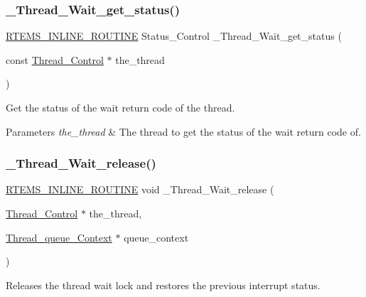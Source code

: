 \subsubsection{\texorpdfstring{\_Thread\_Wait\_get\_status()}{\_Thread\_Wait\_get\_status()}}
{\footnotesize\ttfamily \mbox{\hyperlink{group__RTEMSScoreBaseDefs_gac216239df231d5dbd15e3520b0b9313f}{R\+T\+E\+M\+S\+\_\+\+I\+N\+L\+I\+N\+E\+\_\+\+R\+O\+U\+T\+I\+NE}} Status\+\_\+\+Control \+\_\+\+Thread\+\_\+\+Wait\+\_\+get\+\_\+status (\begin{DoxyParamCaption}\item[{const \mbox{\hyperlink{struct__Thread__Control}{Thread\+\_\+\+Control}} $\ast$}]{the\+\_\+thread }\end{DoxyParamCaption})}



Get the status of the wait return code of the thread. 


\begin{DoxyParams}{Parameters}
{\em the\+\_\+thread} & The thread to get the status of the wait return code of. \\
\hline
\end{DoxyParams}
\mbox{\label{group__RTEMSScoreThread_gacb857fbbdbd059ae8e1f6fca8768da96}} 
\subsubsection{\texorpdfstring{\_Thread\_Wait\_release()}{\_Thread\_Wait\_release()}}
{\footnotesize\ttfamily \mbox{\hyperlink{group__RTEMSScoreBaseDefs_gac216239df231d5dbd15e3520b0b9313f}{R\+T\+E\+M\+S\+\_\+\+I\+N\+L\+I\+N\+E\+\_\+\+R\+O\+U\+T\+I\+NE}} void \+\_\+\+Thread\+\_\+\+Wait\+\_\+release (\begin{DoxyParamCaption}\item[{\mbox{\hyperlink{struct__Thread__Control}{Thread\+\_\+\+Control}} $\ast$}]{the\+\_\+thread,  }\item[{\mbox{\hyperlink{structThread__queue__Context}{Thread\+\_\+queue\+\_\+\+Context}} $\ast$}]{queue\+\_\+context }\end{DoxyParamCaption})}



Releases the thread wait lock and restores the previous interrupt status. 


